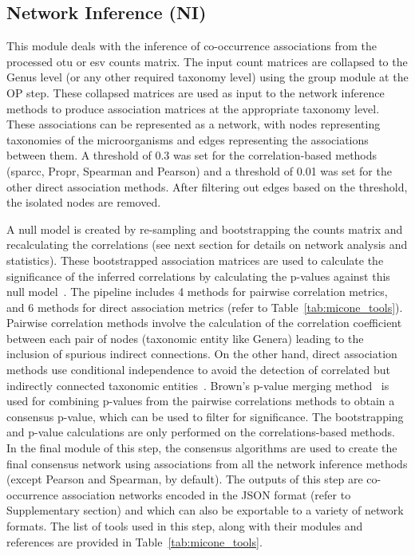   \subsection*{Network Inference (NI)}
  \vspace{-5mm}
  This module deals with the inference of co-occurrence associations from the processed \ac{otu} or \ac{esv} counts matrix.
  The input count matrices are collapsed to the Genus level (or any other required taxonomy level) using the group module at the OP step.
  These collapsed matrices are used as input to the network inference methods to produce association matrices at the appropriate taxonomy level.
  These associations can be represented as a network, with nodes representing taxonomies of the microorganisms and edges representing the associations between them.
  A threshold of 0.3 was set for the correlation-based methods (\ac{sparcc}, Propr, Spearman and Pearson) and a threshold of 0.01 was set for the other direct association methods.
  After filtering out edges based on the threshold, the isolated nodes are removed.

  A null model is created by re-sampling and bootstrapping the counts matrix and recalculating the correlations (see next section for details on network analysis and statistics).
  These bootstrapped association matrices are used to calculate the significance of the inferred correlations by calculating the p-values against this null model~\cite{Watts2018}.
  The pipeline includes 4 methods for pairwise correlation metrics, and 6 methods for direct association metrics (refer to Table~\ref{tab:micone_tools}).
  Pairwise correlation methods involve the calculation of the correlation coefficient between each pair of nodes (taxonomic entity like Genera) leading to the inclusion of spurious indirect connections.
  On the other hand, direct association methods use conditional independence to avoid the detection of correlated but indirectly connected taxonomic entities~\cite{Kurtz2015,Menon2018}.
  Brown's p-value merging method~\cite{brown_400_1975} is used for combining p-values from the pairwise correlations methods to obtain a consensus p-value, which can be used to filter for significance.
  The bootstrapping and p-value calculations are only performed on the correlations-based methods.
  In the final module of this step, the consensus algorithms are used to create the final consensus network using associations from all the network inference methods (except Pearson and Spearman, by default).
  The outputs of this step are co-occurrence association networks encoded in the JSON format (refer to Supplementary section) and which can also be exportable to a variety of network formats.
  The list of tools used in this step, along with their modules and references are provided in Table~\ref{tab:micone_tools}.

